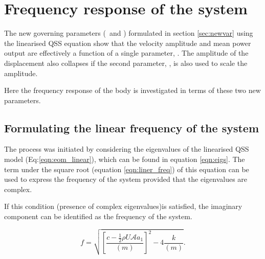 
\section{Frequency response of the system}

The new governing parameters (\massstiff\ and \massdamp) formulated in section \ref{sec:newvar}  using the linearised QSS equation show that the velocity amplitude and mean power output are effectively a function of a single parameter, \massdamp. The amplitude of the displacement also collapses if the second parameter, \massstiff, is also used to scale the amplitude.

Here the frequency response of the body is investigated in terms of these two new parameters.

\subsection{Formulating the linear frequency of the system}

The process was initiated by considering the eigenvalues of the linearised QSS model (Eq:\ref{eqn:eom_linear}), which can be found in equation \ref{eqn:eigs}. The term under the square root (equation \ref{eqn:liner_freq}) of this equation can be used to express the frequency of the system provided that the eigenvalues are complex. 

If this condition (presence of complex eigenvalues)is satisfied, the imaginary component can be identified as the frequency of the system. 

\begin{equation}
\label{eqn:liner_freq}
f = \sqrt{\left[\frac{c-\frac{1}{2}\rho U\mathcal{A}a_1}{(m)}\right]^2-4\frac{k}{(m)}}.
\end{equation}



